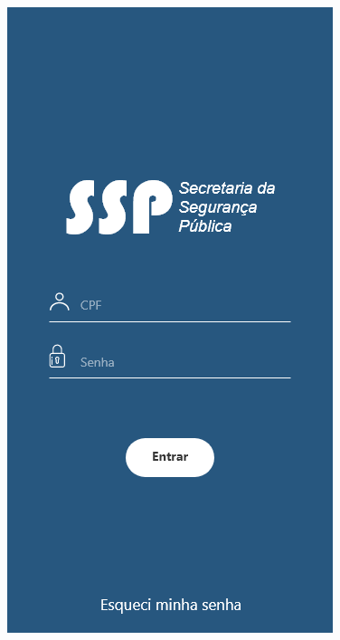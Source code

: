 \documentclass[
	12pt,				%
	openright,			%
	oneside,			%
	a4paper,			%
	english,			%
	brazil,				%
	]{abntex2}
\theoremstyle{theorem}
\theoremstyle{definition}
\begin{document}
\begin{figure}[H]
\centering
\begin{minipage}{.3\textwidth}
      \centering
    \includegraphics[width=.9\linewidth]{imagens/prototipoLogin.png}
    \label{fig: Tela de login}
\end{minipage}
\begin{minipage}{.3\textwidth}
  \centering

\end{minipage}
\end{figure}
\end{document}
